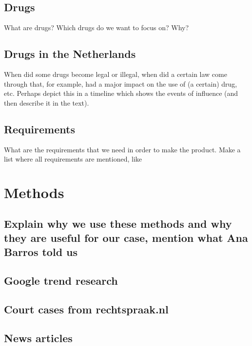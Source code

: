 \subsection{Drugs}
What are drugs? Which drugs do we want to focus on? Why? 

\subsection{Drugs in the Netherlands}
When did some drugs become legal or illegal, when did a certain law come through that, for example, had a major impact on the use of (a certain) drug, etc.
Perhaps depict this in a timeline which shows the events of influence (and then describe it in the text).

\subsection{Requirements}
What are the requirements that we need in order to make the product. Make a list where all requirements are mentioned, like 
\subsection{}

\subsection{}

\section{Methods}
\subsection{Explain why we use these methods and why they are useful for our case, mention what Ana Barros told us}
\subsection{Google trend research}
\subsection{Court cases from rechtspraak.nl}
\subsection{News articles}

